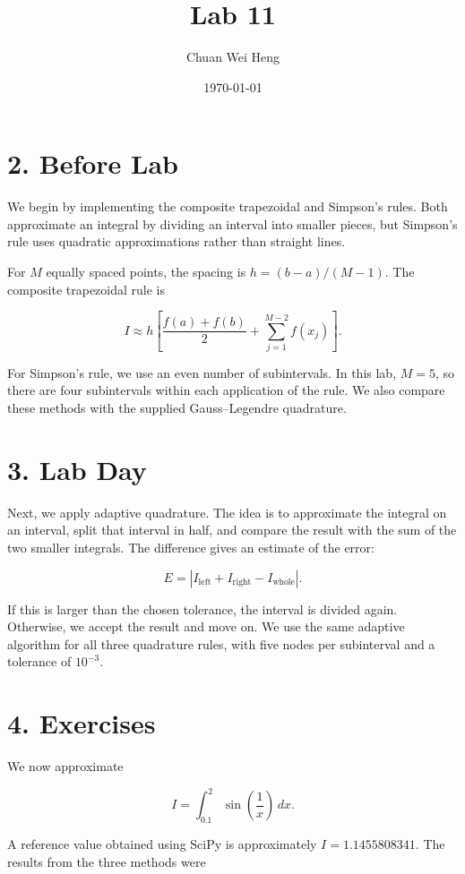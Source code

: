 \documentclass[12pt]{article}
\title{Lab 11}
\author{Chuan Wei Heng}
\date{\today}
\begin{document}
\maketitle

\section*{2. Before Lab}

We begin by implementing the composite trapezoidal and
Simpson's rules. Both approximate an integral by dividing
an interval into smaller pieces, but Simpson's rule uses
quadratic approximations rather than straight lines.

For $M$ equally spaced points, the spacing is
$h=(b-a)/(M-1)$. The composite trapezoidal rule is

\[
I\approx h\left[\frac{f(a)+f(b)}{2}
+\sum_{j=1}^{M-2}f(x_j)\right].
\]

For Simpson's rule, we use an even number of subintervals.
In this lab, $M=5$, so there are four subintervals
within each application of the rule. We also compare
these methods with the supplied Gauss--Legendre quadrature.

\section*{3. Lab Day}

Next, we apply adaptive quadrature. The idea is to
approximate the integral on an interval, split that interval
in half, and compare the result with the sum of the two
smaller integrals. The difference gives an estimate of
the error:

\[
E=\left|I_{\mathrm{left}}+I_{\mathrm{right}}
-I_{\mathrm{whole}}\right|.
\]

If this is larger than the chosen tolerance, the interval
is divided again. Otherwise, we accept the result and
move on. We use the same adaptive algorithm for all three
quadrature rules, with five nodes per subinterval and
a tolerance of $10^{-3}$.

\section*{4. Exercises}

We now approximate

\[
I=\int_{0.1}^{2}\sin\left(\frac{1}{x}\right)\,dx.
\]

A reference value obtained using SciPy is approximately
$I=1.1455808341$. The results from the three methods were
\end{document}
